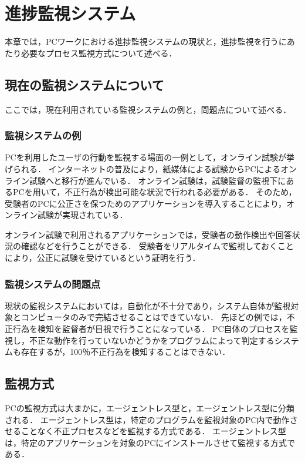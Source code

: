 \chapter{進捗監視システム}

本章では，PCワークにおける進捗監視システムの現状と，進捗監視を行うにあたり必要なプロセス監視方式について述べる．

\section{現在の監視システムについて}

ここでは，現在利用されている監視システムの例と，問題点について述べる．

\subsection{監視システムの例}
PCを利用したユーザの行動を監視する場面の一例として，オンライン試験が挙げられる．
インターネットの普及により，紙媒体による試験からPCによるオンライン試験へと移行が進んでいる．
オンライン試験は，試験監督の監視下にあるPCを用いて，不正行為が検出可能な状況で行われる必要がある．
そのため，受験者のPCに公正さを保つためのアプリケーションを導入することにより，オンライン試験が実現されている．

オンライン試験で利用されるアプリケーションでは，受験者の動作検出や回答状況の確認などを行うことができる．
受験者をリアルタイムで監視しておくことにより，公正に試験を受けているという証明を行う．

\subsection{監視システムの問題点}
現状の監視システムにおいては，自動化が不十分であり，システム自体が監視対象とコンピュータのみで完結させることはできていない．
先ほどの例では，不正行為を検知を監督者が目視で行うことになっている．
PC自体のプロセスを監視し，不正な動作を行っていないかどうかをプログラムによって判定するシステムも存在するが，100％不正行為を検知することはできない．

\section{監視方式}
PCの監視方式は大まかに，エージェントレス型と，エージェントレス型に分類される．
エージェントレス型は，特定のプログラムを監視対象のPC内で動作させることなく不正プロセスなどを監視する方式である．
エージェントレス型は，特定のアプリケーションを対象のPCにインストールさせて監視する方式である．

